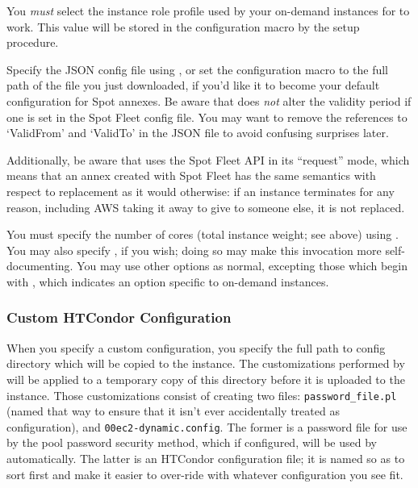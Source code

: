 You \emph{must} select the instance role profile used by your on-demand
instances for  to work.  This value will be stored in the
configuration macro 
by the setup procedure.


Specify the JSON config file using ,
or set the configuration macro  to
the full path of the file you just downloaded, if you'd like it to become
your default configuration for Spot annexes.  Be aware that 
does \emph{not} alter the validity period if one is set in the Spot
Fleet config file.  You may want to remove the references to `ValidFrom'
and `ValidTo' in the JSON file to avoid confusing surprises later.

Additionally, be aware that  uses the Spot Fleet API in
its ``request'' mode, which means that an annex created with Spot
Fleet has the same semantics with respect to replacement as it would
otherwise: if an instance terminates for any reason, including AWS
taking it away to give to someone else, it is not replaced.

You must specify the number of cores (total instance weight; see above) using
.  You may also specify , if you wish;
doing so may make this  invocation more self-documenting.
You may use other options as normal, excepting those which begin with
, which indicates an option specific to on-demand
instances.

\subsubsection{Custom HTCondor Configuration}

When you specify a custom configuration, you specify the full path to
config directory which will be copied to the instance.  The customizations
performed by  will be applied to a temporary copy of this
directory before it is uploaded to the instance.  Those customizations
consist of creating two files: {\tt password\_file.pl} (named that way to ensure
that it isn't ever accidentally treated as configuration), and
{\tt 00ec2-dynamic.config}.  The former is a password file for use by the pool
password security method, which if configured, will be used by 
automatically.  The latter is an HTCondor configuration file; it is named
so as to sort first and make it easier to over-ride with whatever configuration
you see fit.

